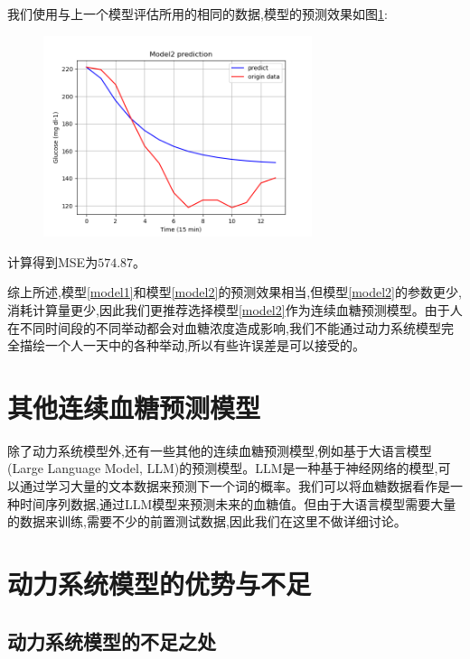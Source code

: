     我们使用与上一个模型评估所用的相同的数据,模型的预测效果如图\ref{fig:predict}:
    \begin{figure}[H]
        \centering
        \includegraphics[width=0.7\textwidth]{Img/predict.png}
        \label{fig:predict}
    \end{figure}

    计算得到MSE为$574.87$。

    综上所述,模型\ref{model1}和模型\ref{model2}的预测效果相当,但模型\ref{model2}的参数更少,消耗计算量更少,因此我们更推荐选择模型\ref{model2}作为连续血糖预测模型。由于人在不同时间段的不同举动都会对血糖浓度造成影响,我们不能通过动力系统模型完全描绘一个人一天中的各种举动,所以有些许误差是可以接受的。

    \section{其他连续血糖预测模型}

    除了动力系统模型外,还有一些其他的连续血糖预测模型,例如基于大语言模型(Large Language Model, LLM)的预测模型\cite{healey2024leveraging}。LLM是一种基于神经网络的模型,可以通过学习大量的文本数据来预测下一个词的概率。我们可以将血糖数据看作是一种时间序列数据,通过LLM模型来预测未来的血糖值。但由于大语言模型需要大量的数据来训练,需要不少的前置测试数据,因此我们在这里不做详细讨论。

    \section{动力系统模型的优势与不足}

    \subsection*{动力系统模型的不足之处}
    
